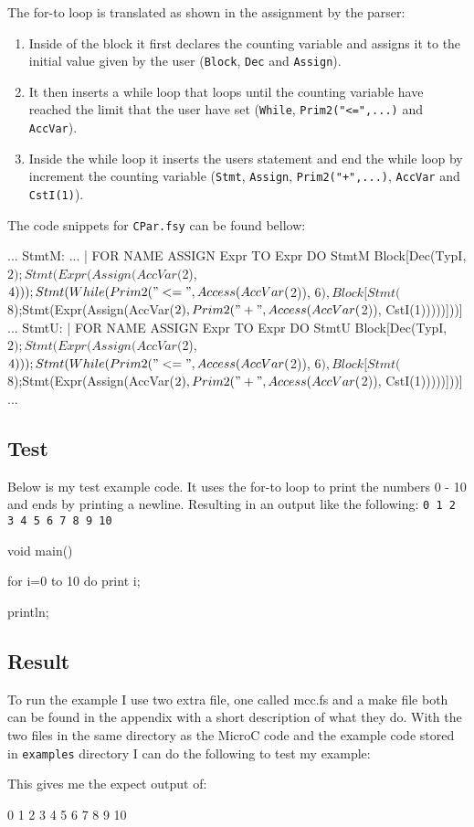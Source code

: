 The for-to loop is translated as shown in the assignment by the parser: 
\begin{enumerate}
    \item Inside of the block it first declares the counting variable and
        assigns it to the initial value given by the user (\texttt{Block},
        \texttt{Dec} and \texttt{Assign}).
    \item It then inserts a while loop that loops until the counting variable
        have reached the limit that the user have set (\texttt{While},
        \texttt{Prim2("<=",...)} and \texttt{AccVar}).
    \item Inside the while loop it inserts the users statement and end the while
        loop by increment the counting variable (\texttt{Stmt}, \texttt{Assign},
        \texttt{Prim2("+",...)}, \texttt{AccVar} and \texttt{CstI(1)}).
\end{enumerate}
The code snippets for \texttt{CPar.fsy} can be found bellow:
\begin{ccode}
...
StmtM:
...
  | FOR NAME ASSIGN Expr TO Expr DO StmtM { Block[Dec(TypI, $2); Stmt(Expr(Assign(AccVar($2), $4))); Stmt(While(Prim2("<=", Access(AccVar($2)), $6), Block[Stmt($8);Stmt(Expr(Assign(AccVar($2), Prim2("+", Access(AccVar($2)), CstI(1)))))]))] }
...
StmtU:
  | FOR NAME ASSIGN Expr TO Expr DO StmtU { Block[Dec(TypI, $2); Stmt(Expr(Assign(AccVar($2), $4))); Stmt(While(Prim2("<=", Access(AccVar($2)), $6), Block[Stmt($8);Stmt(Expr(Assign(AccVar($2), Prim2("+", Access(AccVar($2)), CstI(1)))))]))] }
...
\end{ccode}
\subsection{Test}
Below is my test example code. It uses the for-to loop to print the numbers 0 - 10
and ends by printing a newline. Resulting in an output like the following:
\texttt{0 1 2 3 4 5 6 7 8 9 10}
\begin{ccode}
void main() {
  for i=0 to 10 do 
    print i;

  println;
}
\end{ccode}
\subsection{Result}
To run the example I use two extra file, one called mcc.fs and a make file both can
be found in the appendix with a short description of what they do. With the two
files in the same directory as the MicroC code and the example code stored in
\texttt{examples} directory I can do the following to test my example:
\begin{bashcode}
\end{bashcode}
This gives me the expect output of:
\begin{bashcode}
0 1 2 3 4 5 6 7 8 9 10

\end{bashcode}

